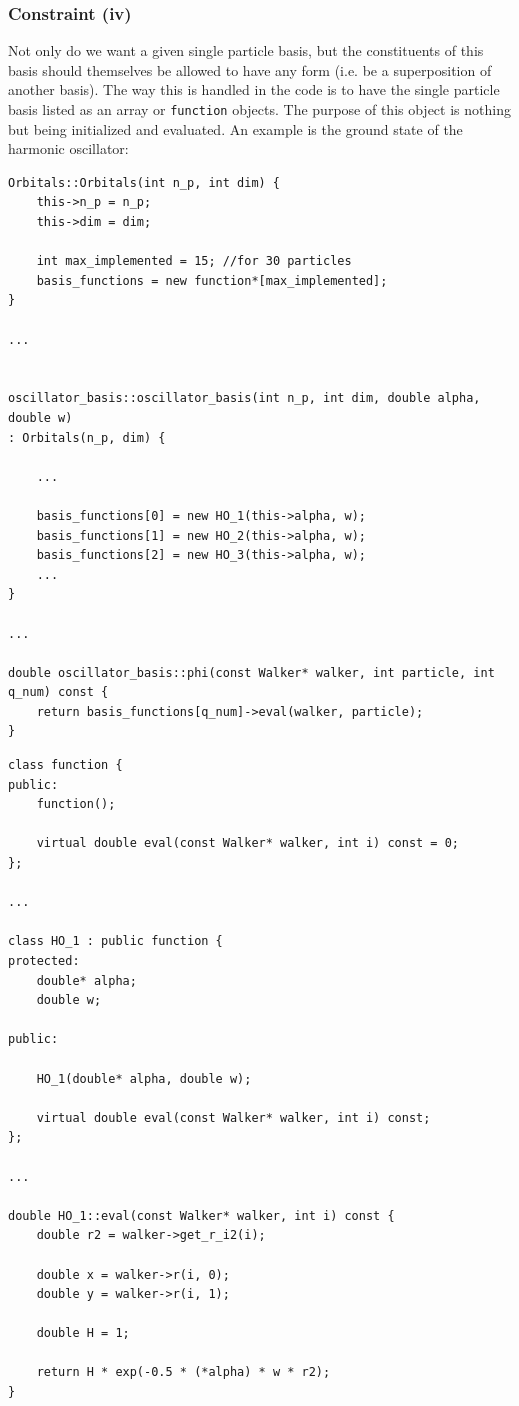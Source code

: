 \subsubsection{Constraint (iv)}

Not only do we want a given single particle basis, but the constituents of this basis should themselves be allowed to have any form (i.e. be a superposition of another basis). The way this is handled in the code is to have the single particle basis listed as an array or \verb+function+ objects. The purpose of this object is nothing but being initialized and evaluated. An example is the ground state of the harmonic oscillator:

\vspace{0.5cm}
\begin{lstlisting}
Orbitals::Orbitals(int n_p, int dim) {
    this->n_p = n_p;
    this->dim = dim;

    int max_implemented = 15; //for 30 particles
    basis_functions = new function*[max_implemented];
}

...


oscillator_basis::oscillator_basis(int n_p, int dim, double alpha, double w)
: Orbitals(n_p, dim) {

    ...

    basis_functions[0] = new HO_1(this->alpha, w);
    basis_functions[1] = new HO_2(this->alpha, w);
    basis_functions[2] = new HO_3(this->alpha, w);
    ...
}

...

double oscillator_basis::phi(const Walker* walker, int particle, int q_num) const {
    return basis_functions[q_num]->eval(walker, particle);
}
\end{lstlisting}

\begin{lstlisting}
class function {
public:
    function();
    
    virtual double eval(const Walker* walker, int i) const = 0;
};

...

class HO_1 : public function {
protected:
    double* alpha;
    double w;

public:

    HO_1(double* alpha, double w);

    virtual double eval(const Walker* walker, int i) const;
};

...

double HO_1::eval(const Walker* walker, int i) const {
    double r2 = walker->get_r_i2(i);

    double x = walker->r(i, 0);
    double y = walker->r(i, 1);

    double H = 1;
    
    return H * exp(-0.5 * (*alpha) * w * r2);
}
\end{lstlisting}

